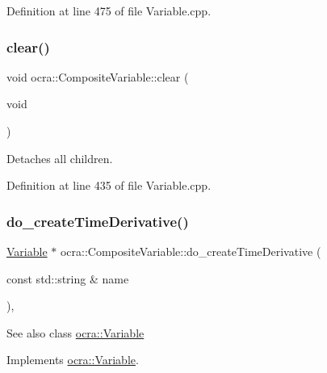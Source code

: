 Definition at line 475 of file Variable.\+cpp.

\hypertarget{classocra_1_1CompositeVariable_a64e6f462d217b4d3ab3d2b5364373ce8}{}\label{classocra_1_1CompositeVariable_a64e6f462d217b4d3ab3d2b5364373ce8} 
\subsubsection{\texorpdfstring{clear()}{clear()}}
{\footnotesize\ttfamily void ocra\+::\+Composite\+Variable\+::clear (\begin{DoxyParamCaption}\item[{void}]{ }\end{DoxyParamCaption})}



Detaches all children. 



Definition at line 435 of file Variable.\+cpp.

\hypertarget{classocra_1_1CompositeVariable_a4ac0f033cea1cb5e4bfdb414765c3743}{}\label{classocra_1_1CompositeVariable_a4ac0f033cea1cb5e4bfdb414765c3743} 
\subsubsection{\texorpdfstring{do\+\_\+create\+Time\+Derivative()}{do\_createTimeDerivative()}}
{\footnotesize\ttfamily \hyperlink{classocra_1_1Variable}{Variable} $\ast$ ocra\+::\+Composite\+Variable\+::do\+\_\+create\+Time\+Derivative (\begin{DoxyParamCaption}\item[{const std\+::string \&}]{name }\end{DoxyParamCaption})\hspace{0.3cm}{\ttfamily [protected]}, {\ttfamily [virtual]}}

\begin{DoxySeeAlso}{See also}
class \hyperlink{classocra_1_1Variable}{ocra\+::\+Variable} 
\end{DoxySeeAlso}


Implements \hyperlink{classocra_1_1Variable_aaed3c9bb3258cc1120ae8f93722a12bb}{ocra\+::\+Variable}.



